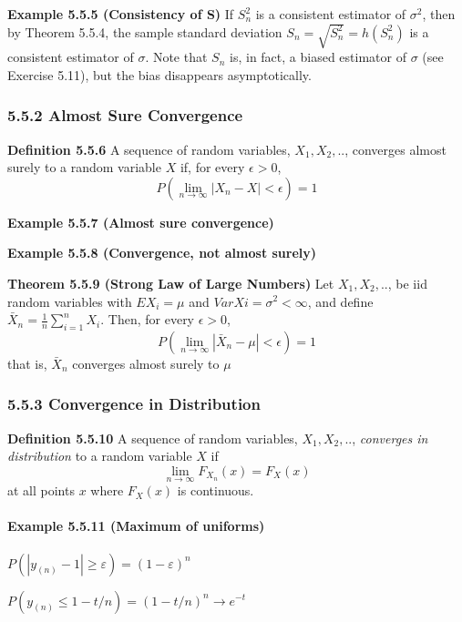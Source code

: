 \documentclass[6pt,twocolumn,Portrait]{article}
\let\oldparagraph\paragraph
\renewcommand{\paragraph}[1]{\oldparagraph{#1}\mbox{}}
\begin{document}
\textbf{Example 5.5.5 (Consistency of S)} If \(S^2_n\) is a consistent
estimator of \(\sigma^2\), then by Theorem 5.5.4, the sample standard
deviation \(S_n=\sqrt{S^2_n}=h(S^2_n)\) is a consistent estimator of
\(\sigma\). Note that \(S_n\) is, in fact, a biased estimator of
\(\sigma\) (see Exercise 5.11), but the bias disappears asymptotically.

\hypertarget{almost-sure-convergence}{%
\subsubsection{5.5.2 Almost Sure
Convergence}\label{almost-sure-convergence}}

\textbf{Definition 5.5.6} A sequence of random variables,
\(X_1,X_2,..\), converges almost surely to a random variable \(X\) if,
for every \(\epsilon>0\), \[P(\lim_{n\to\infty}|X_n-X|<\epsilon)=1\]

\textbf{Example 5.5.7 (Almost sure convergence)}

\textbf{Example 5.5.8 (Convergence, not almost surely)}

\textbf{Theorem 5.5.9 (Strong Law of Large Numbers)} Let \(X_1,X_2,..\),
be iid random variables with \(EX_i=\mu\) and
\(Var Xi =\sigma^2<\infty\), and define
\(\bar X_n=\frac1n\sum_{i=1}^nX_i\). Then, for every \(\epsilon>0\),
\[P(\lim_{n\to\infty}|\bar X_n-\mu|<\epsilon)=1\] that is, \(\bar X_n\)
converges almost surely to \(\mu\)

\hypertarget{convergence-in-distribution}{%
\subsubsection{5.5.3 Convergence in
Distribution}\label{convergence-in-distribution}}

\textbf{Definition 5.5.10} A sequence of random variables,
\(X_1,X_2,..\), \emph{converges in distribution} to a random variable
\(X\) if \[\lim_{n\to\infty}F_{X_n}(x)=F_X(x)\] at all points \(x\)
where \(F_X(x)\) is continuous.

\hypertarget{Max-Unif}{%
\paragraph{\texorpdfstring{\textbf{Example 5.5.11 (Maximum of
uniforms)}}{Example 5.5.11 (Maximum of uniforms)}}\label{Max-Unif}}

\(P(|y_{(n)}-1|\ge\varepsilon)=(1-\varepsilon)^n\)

\(P(y_{(n)}\le1-t/n)=(1-t/n)^n\to e^{-t}\)
\end{document}
